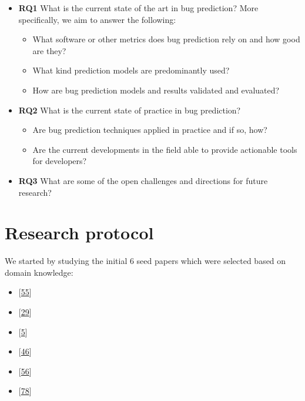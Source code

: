 \documentclass[]{book}
\providecommand{\tightlist}{%
  \setlength{\itemsep}{0pt}\setlength{\parskip}{0pt}}
\begin{document}
\begin{itemize}
\tightlist
\item
  \textbf{RQ1} What is the current state of the art in bug prediction?
  More specifically, we aim to answer the following:

  \begin{itemize}
  \tightlist
  \item
    What software or other metrics does bug prediction rely on and how
    good are they?
  \item
    What kind prediction models are predominantly used?
  \item
    How are bug prediction models and results validated and evaluated?
  \end{itemize}
\item
  \textbf{RQ2} What is the current state of practice in bug prediction?

  \begin{itemize}
  \tightlist
  \item
    Are bug prediction techniques applied in practice and if so, how?
  \item
    Are the current developments in the field able to provide actionable
    tools for developers?
  \end{itemize}
\item
  \textbf{RQ3} What are some of the open challenges and directions for
  future research?
\end{itemize}

\section{Research protocol}\label{research-protocol-1}

We started by studying the initial 6 seed papers which were selected
based on domain knowledge:

\begin{itemize}
\tightlist
\item
  {[}\protect\hyperlink{ref-Gyimothy2005}{55}{]}
\item
  {[}\protect\hyperlink{ref-Catal2009review}{29}{]}
\item
  {[}\protect\hyperlink{ref-Arisholm2010}{5}{]}
\item
  {[}\protect\hyperlink{ref-DAmbros2010}{46}{]}
\item
  {[}\protect\hyperlink{ref-Hall2012}{56}{]}
\item
  {[}\protect\hyperlink{ref-Lewis2013}{78}{]}
\end{itemize}
\end{document}
